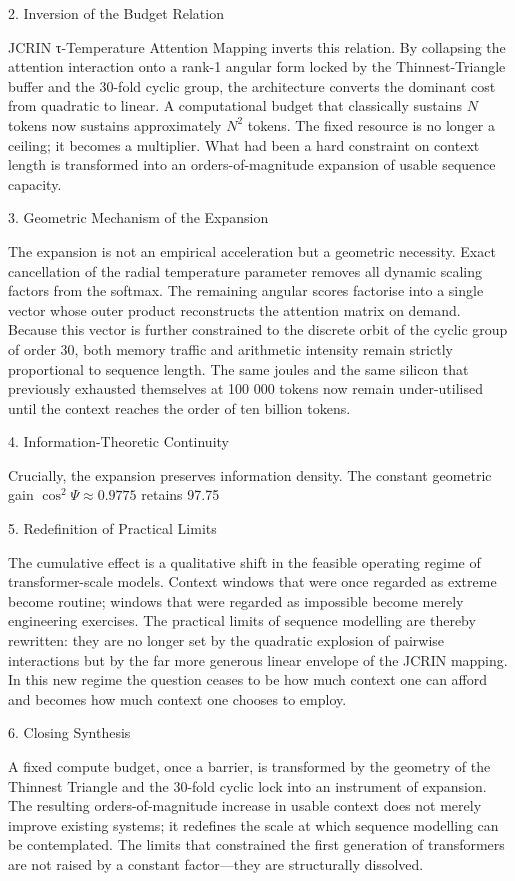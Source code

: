 2. Inversion of the Budget Relation

JCRIN τ-Temperature Attention Mapping inverts this relation. By collapsing the attention interaction onto a rank-1 angular form locked by the Thinnest-Triangle buffer and the 30-fold cyclic group, the architecture converts the dominant cost from quadratic to linear. A computational budget that classically sustains \(N\) tokens now sustains approximately \(N^2\) tokens. The fixed resource is no longer a ceiling; it becomes a multiplier. What had been a hard constraint on context length is transformed into an orders-of-magnitude expansion of usable sequence capacity.

3. Geometric Mechanism of the Expansion

The expansion is not an empirical acceleration but a geometric necessity. Exact cancellation of the radial temperature parameter removes all dynamic scaling factors from the softmax. The remaining angular scores factorise into a single vector whose outer product reconstructs the attention matrix on demand. Because this vector is further constrained to the discrete orbit of the cyclic group of order 30, both memory traffic and arithmetic intensity remain strictly proportional to sequence length. The same joules and the same silicon that previously exhausted themselves at 100 000 tokens now remain under-utilised until the context reaches the order of ten billion tokens.

4. Information-Theoretic Continuity

Crucially, the expansion preserves information density. The constant geometric gain \(\cos^2\Psi \approx 0.9775\) retains 97.75 %

5. Redefinition of Practical Limits

The cumulative effect is a qualitative shift in the feasible operating regime of transformer-scale models. Context windows that were once regarded as extreme become routine; windows that were regarded as impossible become merely engineering exercises. The practical limits of sequence modelling are thereby rewritten: they are no longer set by the quadratic explosion of pairwise interactions but by the far more generous linear envelope of the JCRIN mapping. In this new regime the question ceases to be how much context one can afford and becomes how much context one chooses to employ.

6. Closing Synthesis

A fixed compute budget, once a barrier, is transformed by the geometry of the Thinnest Triangle and the 30-fold cyclic lock into an instrument of expansion. The resulting orders-of-magnitude increase in usable context does not merely improve existing systems; it redefines the scale at which sequence modelling can be contemplated. The limits that constrained the first generation of transformers are not raised by a constant factor—they are structurally dissolved.
